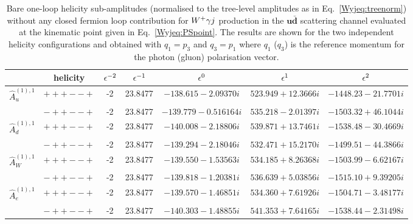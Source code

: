 \documentclass[main.tex]{subfiles}
\begin{document}
\begin{table}[t!]
\centering
\begin{tabularx}{1.0\textwidth}{|C{0.7}|C{1.0}|C{0.6}|C{1.0}|C{1.2}|C{1.2}|C{1.3}|}
\hline
      & helicity & $\epsilon^{-2}$ & $\epsilon^{-1}$ & $\epsilon^{0}$ & $\epsilon^{1}$ & $\epsilon^{2}$ \\
\hline
$\hat A^{(1),1}_u$ & $\scriptstyle +++--+$ & -2 & 23.8477 & $-138.615 - 2.09370  i$ & $523.949 + 12.3666 i$ & $-1448.23 - 21.7701 i$ \\
                   & $\scriptstyle -++--+$ & -2 & 23.8477 & $-139.779 - 0.516164 i$ & $535.218 - 2.01397 i$ & $-1503.32 + 46.1044 i$ \\
\hline
$\hat A^{(1),1}_d$ & $\scriptstyle +++--+$ & -2 & 23.8477 & $-140.008 - 2.18806 i$  & $539.871 + 13.7461 i$ & $-1538.48 - 30.4669 i$ \\
                   & $\scriptstyle -++--+$ & -2 & 23.8477 & $-139.294 - 2.18046 i$  & $532.471 + 15.2170 i$ & $-1499.51 - 44.3866 i$ \\
\hline
$\hat A^{(1),1}_W$ & $\scriptstyle +++--+$ & -2 & 23.8477 & $-139.550 - 1.53563 i$  & $534.185 + 8.26368 i$ & $-1503.99 - 6.62167 i$ \\
                   & $\scriptstyle -++--+$ & -2 & 23.8477 & $-139.818 - 1.20381 i$  & $536.639 + 5.03856 i$ & $-1515.10 + 9.39205 i$ \\
\hline
$\hat A^{(1),1}_e$ & $\scriptstyle +++--+$ & -2 & 23.8477 & $-139.570 - 1.46851 i$  & $534.360 + 7.61926 i$ & $-1504.71 - 3.48177 i$ \\
                   & $\scriptstyle -++--+$ & -2 & 23.8477 & $-140.303 - 1.48855 i$  & $541.353 + 7.64165 i$ & $-1538.44 - 2.31498 i$ \\
\hline
\end{tabularx}
\caption{\label{Wyjtab:benchmark1Lnf0bare} 
Bare one-loop helicity sub-amplitudes (normalised to the tree-level amplitudes as in Eq.~\eqref{Wyjeq:treenorm}) without any closed fermion loop contribution  
for $W^+\gamma j$ production in the $\mathbf{u\bar{d}}$ scattering channel 
evaluated at the kinematic point given in Eq.~\eqref{Wyjeq:PSpoint}. The results are shown for the two independent helicity configurations and obtained with $q_1 = p_3$ and $q_3 = p_1$ where $q_1$ ($q_3$) is the 
reference momentum for the photon (gluon) polarisation vector.
}
\end{table}
\end{document}
